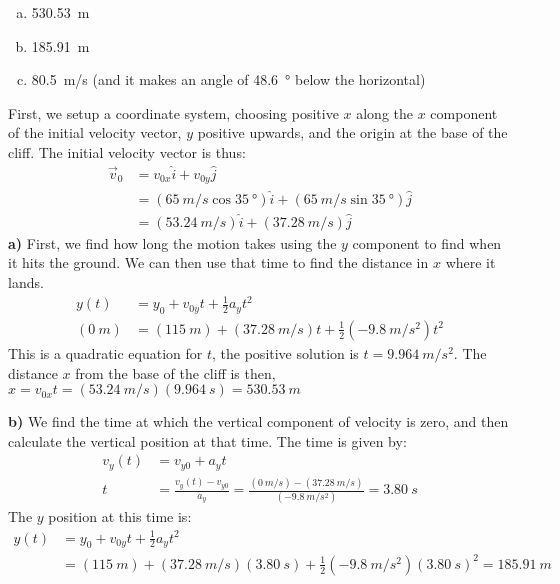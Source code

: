 \begin{finalanswer}
\begin{enumerate}[(a)]
\item \SI{530.53}{m}
\item \SI{185.91}{m}
\item \SI{80.5}{m/s} (and it makes an angle of \SI{48.6}{\degree} below the horizontal)
\end{enumerate}
\end{finalanswer}
\begin{solution}
First, we setup a coordinate system, choosing positive $x$ along the $x$ component of the initial velocity vector, $y$ positive upwards, and the origin at the base of the cliff. The initial velocity vector is thus:
\begin{align*}
\vec v_0 &= v_{0x}\hat i + v_{0y}\hat j\\
&=(\SI{65}{m/s}\cos\SI{35}{\degree})\hat i + (\SI{65}{m/s}\sin\SI{35}{\degree}) \hat j \\
&=(\SI{53.24}{m/s})\hat i + (\SI{37.28}{m/s}) \hat j 
\end{align*}
\textbf{a)} First, we find how long the motion takes using the $y$ component to find when it hits the ground. We can then use that time to find the distance in $x$ where it lands.
\begin{align*}
y(t) &= y_0 +  v_{0y}t+\frac{1}{2}a_yt^2\\
(\SI{0}{m})&= (\SI{115}{m}) + (\SI{37.28}{m/s})t + \frac{1}{2}(\SI{-9.8}{m/s^2})t^2
\end{align*}
This is a quadratic equation for $t$, the positive solution is $t=\SI{9.964}{m/s^2}$. The distance $x$ from the base of the cliff is then, $x=v_{0x}t=(\SI{53.24}{m/s})(\SI{9.964}{s})=\SI{530.53}{m}$


\textbf{b)} We find the time at which the vertical component of velocity is zero, and then calculate the vertical position at that time. The time is given by:
\begin{align*}
v_y(t) &= v_{y0}+a_yt\\
t &= \frac{v_y(t) - v_{y0}}{a_y}=\frac{(\SI{0}{m/s})-(\SI{37.28}{m/s})}{(\SI{-9.8}{m/s^2})}=\SI{3.80}{s}
\end{align*}
The $y$ position at this time is:
\begin{align*}
y(t) &= y_0 +  v_{0y}t+\frac{1}{2}a_yt^2\\
&=(\SI{115}{m}) + (\SI{37.28}{m/s})(\SI{3.80}{s}) + \frac{1}{2}(\SI{-9.8}{m/s^2})(\SI{3.80}{s})^2=\SI{185.91}{m}
\end{align*}



\end{solution}
